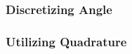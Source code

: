 \begin{frame}
        \frametitle{Discretizing Angle}
\end{frame}

\begin{frame}
        \frametitle{Utilizing Quadrature}
\end{frame}

